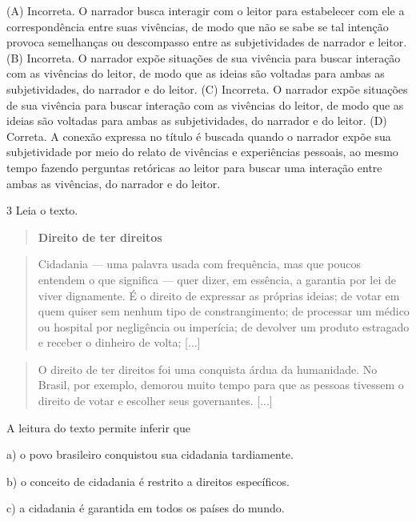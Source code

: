 (A) Incorreta. O narrador busca interagir com o leitor para estabelecer
com ele a correspondência entre suas vivências, de modo que não se sabe
se tal intenção provoca semelhanças ou descompasso entre as
subjetividades de narrador e leitor. (B) Incorreta. O narrador expõe
situações de sua vivência para buscar interação com as vivências do
leitor, de modo que as ideias são voltadas para ambas as subjetividades,
do narrador e do leitor. (C) Incorreta. O narrador expõe situações de
sua vivência para buscar interação com as vivências do leitor, de modo
que as ideias são voltadas para ambas as subjetividades, do narrador e
do leitor. (D) Correta. A conexão expressa no título é buscada quando o
narrador expõe sua subjetividade por meio do relato de vivências e
experiências pessoais, ao mesmo tempo fazendo perguntas retóricas ao
leitor para buscar uma interação entre ambas as vivências, do narrador e
do leitor.

\num{3} Leia o texto.

\begin{quote}
\textbf{Direito de ter direitos}
\end{quote}

\begin{quote}
Cidadania --- uma palavra usada com frequência, mas que poucos entendem
o que significa --- quer dizer, em essência, a garantia por lei de viver
dignamente. É o direito de expressar as próprias ideias; de votar em
quem quiser sem nenhum tipo de constrangimento; de processar um médico
ou hospital por negligência ou imperícia; de devolver um produto
estragado e receber o dinheiro de volta; {[}...{]}
\end{quote}

\begin{quote}
O direito de ter direitos foi uma conquista árdua da humanidade. No
Brasil, por exemplo, demorou muito tempo para que as pessoas tivessem o
direito de votar e escolher seus governantes. {[}...{]}
\end{quote}


A leitura do texto permite inferir que

a) o povo brasileiro conquistou sua cidadania tardiamente.

b) o conceito de cidadania é restrito a direitos específicos.

c) a cidadania é garantida em todos os países do mundo.

